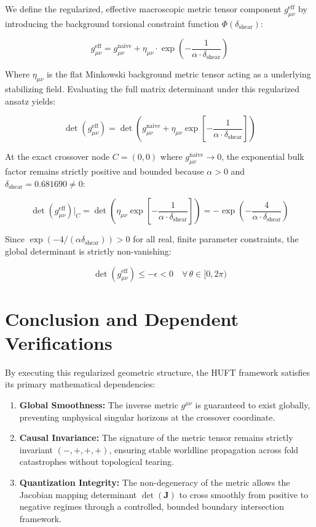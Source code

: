 \documentclass[11pt,a4paper]{article}
\begin{document}
We define the regularized, effective macroscopic metric tensor component $g_{\mu\nu}^{\text{eff}}$ by introducing the background torsional constraint function $\Phi(\delta_{\text{shear}})$:

\begin{equation}
    g_{\mu\nu}^{\text{eff}} = g_{\mu\nu}^{\text{naive}} + \eta_{\mu\nu} \cdot \exp\left(-\frac{1}{\alpha \cdot \delta_{\text{shear}}}\right)
\end{equation}

Where $\eta_{\mu\nu}$ is the flat Minkowski background metric tensor acting as a underlying stabilizing field. Evaluating the full matrix determinant under this regularized ansatz yields:

\begin{equation}
    \det(g_{\mu\nu}^{\text{eff}}) = \det\left(g_{\mu\nu}^{\text{naive}} + \eta_{\mu\nu}\exp\left[-\frac{1}{\alpha \cdot \delta_{\text{shear}}}\right]\right)
\end{equation}

At the exact crossover node $C=(0,0)$ where $g_{\mu\nu}^{\text{naive}} \to 0$, the exponential bulk factor remains strictly positive and bounded because $\alpha > 0$ and $\delta_{\text{shear}} = 0.681690 \neq 0$:

\begin{equation}
    \det(g_{\mu\nu}^{\text{eff}})\Big|_{C} = \det\left(\eta_{\mu\nu}\exp\left[-\frac{1}{\alpha \cdot \delta_{\text{shear}}}\right]\right) = - \exp\left(-\frac{4}{\alpha \cdot \delta_{\text{shear}}}\right)
\end{equation}

Since $\exp(-4 / (\alpha\delta_{\text{shear}})) > 0$ for all real, finite parameter constraints, the global determinant is strictly non-vanishing:

\begin{equation}
    \det(g_{\mu\nu}^{\text{eff}}) \leq -\epsilon < 0 \quad \forall \, \theta \in [0, 2\pi)
\end{equation}

\section{Conclusion and Dependent Verifications}
By executing this regularized geometric structure, the HUFT framework satisfies its primary mathematical dependencies:
\begin{enumerate}
    \item \textbf{Global Smoothness:} The inverse metric $g^{\mu\nu}$ is guaranteed to exist globally, preventing unphysical singular horizons at the crossover coordinate.
    \item \textbf{Causal Invariance:} The signature of the metric tensor remains strictly invariant $(-, +, +, +)$, ensuring stable worldline propagation across fold catastrophes without topological tearing.
    \item \textbf{Quantization Integrity:} The non-degeneracy of the metric allows the Jacobian mapping determinant $\det(\mathbf{J})$ to cross smoothly from positive to negative regimes through a controlled, bounded boundary intersection framework.
\end{enumerate}
\end{document}

